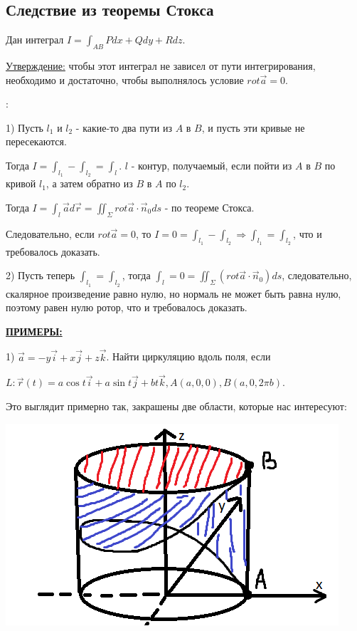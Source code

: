 \documentclass[12pt]{article}
\begin{document}
\subsection{Следствие из теоремы Стокса}
Дан интеграл $I = \int_{AB} Pdx + Qdy + Rdz$. \par
\uline{Утверждение:} чтобы этот интеграл не зависел от пути интегрирования, необходимо и достаточно, чтобы выполнялось условие  $rot \overrightarrow{a} = 0$.\par
{}:\par
1) Пусть $l_1$ и $l_2$ - какие-то два пути из $A$ в $B$, и пусть эти кривые не пересекаются.\par
Тогда $I = \int_{l_1} - \int_{l_2} = \int_l$. $l$ - контур, получаемый, если пойти из $A$ в $B$ по кривой $l_1$, а затем обратно из $B$ в $A$ по $l_2$.\par
Тогда $I = \int_l \overrightarrow{a} d \overrightarrow{r} = \iint_{\Sigma} rot \overrightarrow{a} \cdot \overrightarrow{n}_0 ds$ - по теореме Стокса.\par
Следовательно, если $rot \overrightarrow{a} = 0$, то $I = 0 = \int_{l_1} - \int_{l_2} \Rightarrow \int_{l_1} = \int_{l_2}$, что и требовалось доказать.\par
2) Пусть теперь $\int_{l_1} = \int_{l_2}$, тогда $\int_l = 0 = \iint_{\Sigma} (rot \overrightarrow{a} \cdot \overrightarrow{n}_0) ds$, следовательно, скалярное произведение равно нулю, но нормаль не может быть равна нулю, поэтому равен нулю ротор, что и требовалось доказать.\par
\uline{\textbf{ПРИМЕРЫ:}}\par
1) $\overrightarrow{a} = -y \overrightarrow{i} + x \overrightarrow{j} + z \overrightarrow{k}$. Найти циркуляцию вдоль поля, если\par
$L: \overrightarrow{r}(t) = a \cos t \overrightarrow{i} + a \sin t \overrightarrow{j} + b t \overrightarrow{k}, A(a,0,0), B(a,0,2 \pi b)$.\par
Это выглядит примерно так, закрашены две области, которые нас интересуют:\par
\includegraphics{stokesExample1}\par
\end{document}
